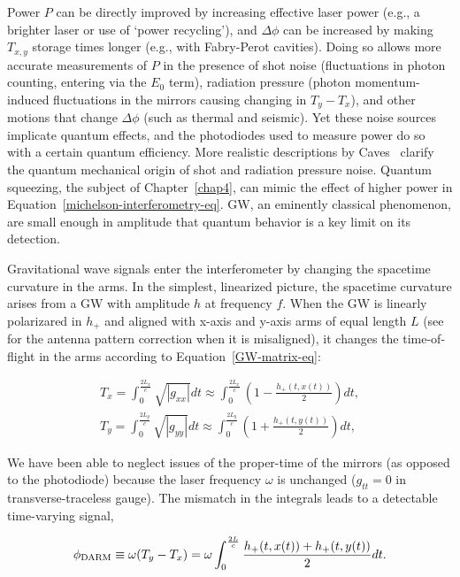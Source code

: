 Power $P$ can be directly improved by increasing effective laser power (e.g., a brighter laser or use of `power recycling'), and $\Delta \phi$ can be increased by making $T_{x,y}$ storage times longer (e.g., with Fabry-Perot cavities).
Doing so allows more accurate measurements of $P$ in the presence of shot noise (fluctuations in photon counting, entering via the $E_0$ term), radiation pressure (photon momentum-induced fluctuations in the mirrors causing changing in $T_y - T_x$), and other motions that change $\Delta \phi$ (such as thermal and seismic).
Yet these noise sources implicate quantum effects, and the photodiodes used to measure power do so with a certain quantum efficiency.
More realistic descriptions by Caves~\cite{Caves1980,Caves1981} clarify the quantum mechanical origin of shot and radiation pressure noise.
Quantum squeezing, the subject of Chapter~\ref{chap4}, can mimic the effect of higher power in Equation~\ref{michelson-interferometry-eq}.
GW, an eminently classical phenomenon, are small enough in amplitude that quantum behavior is a key limit on its detection.

Gravitational wave signals enter the interferometer by changing the spacetime curvature in the arms. 
In the simplest, linearized picture, the spacetime curvature arises from a GW with amplitude $h$ at frequency $f$.
When the GW is linearly polarizared in $h_+$ and aligned with x-axis and y-axis arms of equal length $L$ (see~\cite{Jaranowski1998} for the antenna pattern correction when it is misaligned), it changes the time-of-flight in the arms according to Equation~\ref{GW-matrix-eq}:

\begin{eqnarray}
T_x = \int_0^{\frac{2L_x}{c}} \sqrt{|g_{xx}|} dt \approx \int_0^{\frac{2L_x}{c}} \left(1 - \frac{h_+ (t,x(t))}{2} \right) dt, \\
T_y = \int_0^{\frac{2L_y}{c}} \sqrt{|g_{yy}|} dt \approx \int_0^{\frac{2L_y}{c}} \left(1 + \frac{h_+ (t, y(t))}{2} \right) dt,
\end{eqnarray}

\noindent We have been able to neglect issues of the proper-time of the mirrors (as opposed to the photodiode) because the laser frequency $\omega$ is unchanged ($g_{tt} = 0$ in transverse-traceless gauge).
The mismatch in the integrals leads to a detectable time-varying signal,

\begin{equation}
\phi_{\textup{DARM}} \equiv \omega (T_y - T_x) = \omega \int_0^{\frac{2L}{c}} \frac{h_+ (t, x(t)) + h_+ (t, y(t))}{2} dt.
\end{equation}  

